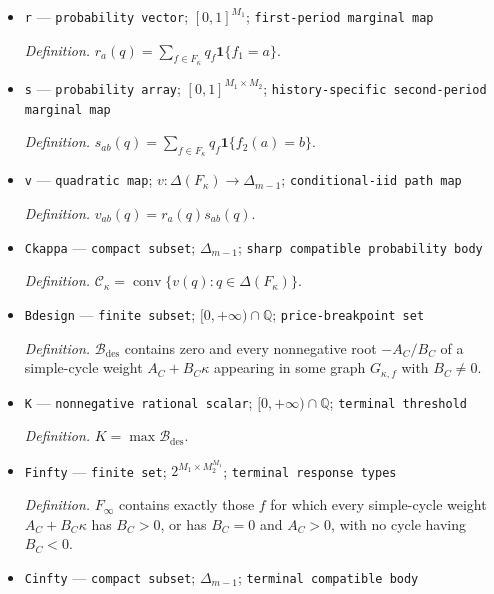 \documentclass{article}
\begin{document}
\begin{itemize}
  \par\smallskip\noindent\emph{Definition.} \(q=(q_f:f\in F_\kappa)\) is a probability law on feasible response tables.
  \item \texttt{r} --- \texttt{probability vector}; \([0,1]^{M_1}\); \texttt{first-\allowbreak{}period marginal map}
  \par\smallskip\noindent\emph{Definition.} \(r_a(q)=\sum_{f\in F_\kappa}q_f\mathbf 1\{f_1=a\}\).
  \item \texttt{s} --- \texttt{probability array}; \([0,1]^{M_1\times M_2}\); \texttt{history-\allowbreak{}specific second-\allowbreak{}period marginal map}
  \par\smallskip\noindent\emph{Definition.} \(s_{ab}(q)=\sum_{f\in F_\kappa}q_f\mathbf 1\{f_2(a)=b\}\).
  \item \texttt{v} --- \texttt{quadratic map}; \(v:\Delta(F_\kappa)\to\Delta_{m-1}\); \texttt{conditional-\allowbreak{}iid path map}
  \par\smallskip\noindent\emph{Definition.} \(v_{ab}(q)=r_a(q)s_{ab}(q)\).
  \item \texttt{Ckappa} --- \texttt{compact subset}; \(\Delta_{m-1}\); \texttt{sharp compatible probability body}
  \par\smallskip\noindent\emph{Definition.} \(\mathcal C_\kappa=\operatorname{conv}\{v(q):q\in\Delta(F_\kappa)\}\).
  \item \texttt{Bdesign} --- \texttt{finite subset}; \([0,+\infty)\cap\mathbb Q\); \texttt{price-\allowbreak{}breakpoint set}
  \par\smallskip\noindent\emph{Definition.} \(\mathcal B_{\mathrm{des}}\) contains zero and every nonnegative root \(-A_C/B_C\) of a simple-cycle weight \(A_C+B_C\kappa\) appearing in some graph \(G_{\kappa,f}\) with \(B_C\ne0\).
  \item \texttt{K} --- \texttt{nonnegative rational scalar}; \([0,+\infty)\cap\mathbb Q\); \texttt{terminal threshold}
  \par\smallskip\noindent\emph{Definition.} \(K=\max\mathcal B_{\mathrm{des}}\).
  \item \texttt{Finfty} --- \texttt{finite set}; \(2^{M_1\times M_2^{M_1}}\); \texttt{terminal response types}
  \par\smallskip\noindent\emph{Definition.} \(F_\infty\) contains exactly those \(f\) for which every simple-cycle weight \(A_C+B_C\kappa\) has \(B_C>0\), or has \(B_C=0\) and \(A_C>0\), with no cycle having \(B_C<0\).
  \item \texttt{Cinfty} --- \texttt{compact subset}; \(\Delta_{m-1}\); \texttt{terminal compatible body}

\end{itemize}
\end{document}
